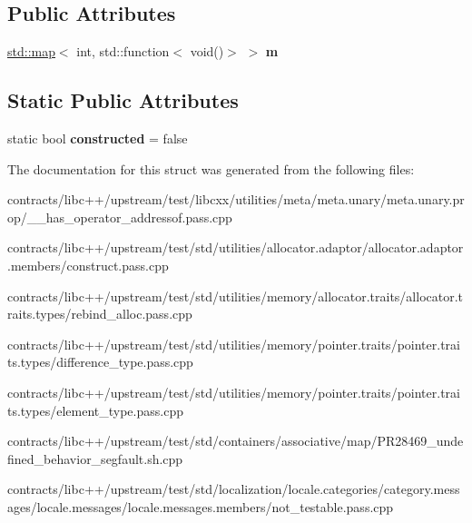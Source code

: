 \subsection*{Public Attributes}
\begin{DoxyCompactItemize}
\item 
\mbox{\label{struct_f_aa8a3142f34d5beb13c5d6e7dae8d918d}} 
\mbox{\hyperlink{classstd_1_1map}{std\+::map}}$<$ int, std\+::function$<$ void()$>$ $>$ {\bfseries m}
\end{DoxyCompactItemize}
\subsection*{Static Public Attributes}
\begin{DoxyCompactItemize}
\item 
\mbox{\label{struct_f_a18248c4becccf42788a58098005e281e}} 
static bool {\bfseries constructed} = false
\end{DoxyCompactItemize}


The documentation for this struct was generated from the following files\+:\begin{DoxyCompactItemize}
\item 
contracts/libc++/upstream/test/libcxx/utilities/meta/meta.\+unary/meta.\+unary.\+prop/\+\_\+\+\_\+has\+\_\+operator\+\_\+addressof.\+pass.\+cpp\item 
contracts/libc++/upstream/test/std/utilities/allocator.\+adaptor/allocator.\+adaptor.\+members/construct.\+pass.\+cpp\item 
contracts/libc++/upstream/test/std/utilities/memory/allocator.\+traits/allocator.\+traits.\+types/rebind\+\_\+alloc.\+pass.\+cpp\item 
contracts/libc++/upstream/test/std/utilities/memory/pointer.\+traits/pointer.\+traits.\+types/difference\+\_\+type.\+pass.\+cpp\item 
contracts/libc++/upstream/test/std/utilities/memory/pointer.\+traits/pointer.\+traits.\+types/element\+\_\+type.\+pass.\+cpp\item 
contracts/libc++/upstream/test/std/containers/associative/map/P\+R28469\+\_\+undefined\+\_\+behavior\+\_\+segfault.\+sh.\+cpp\item 
contracts/libc++/upstream/test/std/localization/locale.\+categories/category.\+messages/locale.\+messages/locale.\+messages.\+members/not\+\_\+testable.\+pass.\+cpp\end{DoxyCompactItemize}
